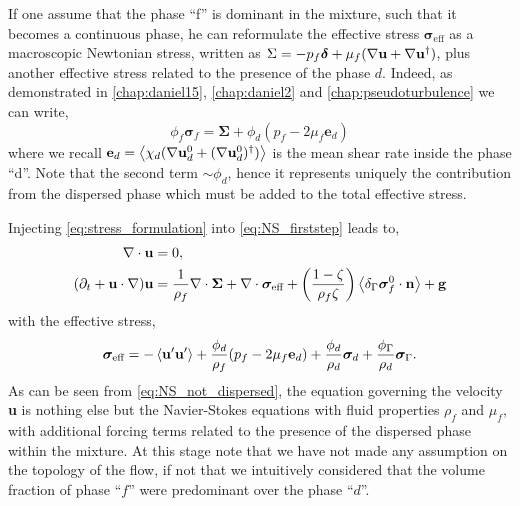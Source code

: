 If one assume that the phase ``f'' is dominant in the mixture, such that it becomes a continuous phase, he can reformulate the effective stress $\bm\sigma_\text{eff}$ as a macroscopic Newtonian stress, written as $\Sigma = -  p_f \bm\delta  + \mu_f(\mathbf{\nabla} \textbf{u} + \mathbf{\nabla} \textbf{u}^\dagger)$, plus another effective stress related to the presence of the phase $d$.
Indeed, as demonstrated in \ref{chap:daniel15}, \ref{chap:daniel2} and \ref{chap:pseudoturbulence} we can write,
\begin{equation}
    \phi_f\bm\sigma_f
    = \bm\Sigma
    + \phi_d (p_f - 2\mu_f \textbf{e}_d)
    \label{eq:stress_formulation}
\end{equation}
where we recall $\textbf{e}_d = \left<\chi_d (\mathbf{\nabla} \textbf{u}_d^0+(\mathbf{\nabla} \textbf{u}_d^0)^\dagger)\right>$ is the mean shear rate inside the phase ``d''. 
Note that the second term $\sim \phi_d$, hence it represents uniquely the contribution from the dispersed phase which must be added to the total effective stress. 

Injecting \ref{eq:stress_formulation} into \ref{eq:NS_firststep} leads to, 
\begin{align}
    \label{eq:NS_not_dispersed_mass}
    \div\textbf{u}&=0, \\
    (\pddt 
    + \textbf{u}\cdot \grad)
    \textbf{u}
    &= 
    \frac{1}{\rho_f}\div \bm\Sigma
    + \div \bm{\sigma}_\text{eff} 
    + \left(\frac{1-\zeta}{\rho_f\zeta}\right) \avg{\delta_\Gamma \bm{\sigma}_f^0 \cdot \textbf{n}} 
    + \textbf{g} 
    \label{eq:NS_not_dispersed}
\end{align}
with the effective stress, 
\begin{equation}
    \bm\sigma_\text{eff} = 
    - \left< \textbf{u}'\textbf{u}'\right>
    + \frac{\phi_d}{\rho_f} (p_f - 2\mu_f \textbf{e}_d)
    + \frac{\phi_d}{\rho_d}\bm\sigma_d
    + \frac{\phi_\Gamma}{\rho_d} \bm\sigma_\Gamma. 
\end{equation}
As can be seen from \ref{eq:NS_not_dispersed}, the equation governing the velocity \textbf{u} is nothing else but the Navier-Stokes equations with fluid properties $\rho_f$ and $\mu_f$, with additional forcing terms related to the presence of the dispersed phase within the mixture. 
At this stage note that we have not made any assumption on the topology of the flow, if not that we intuitively considered that the volume fraction of phase ``$f$'' were predominant over the phase ``$d$''. 


